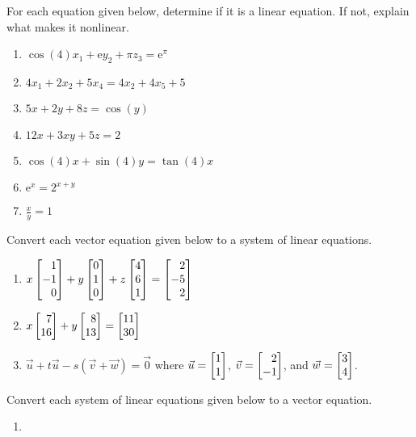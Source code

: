 \begin{exercises}
	\begin{problist}
		\prob For each equation given below, determine if it is a linear
		equation. If not, explain what makes it nonlinear.
		\begin{enumerate}
			\item $\cos(4)x_{1}+\mathrm{e}y_{2}+\pi z_{3}=\mathrm{e}^{\pi}$

			\item $4x_{1}+2x_{2}+5x_{4}=4x_{2}+4x_{5}+5$
			
			\item $5x+2y+8z=\cos(y)$

			\item $12x+3xy+5z=2$

			\item $\cos(4)x+\sin(4)y=\tan(4)x$

			\item $\mathrm{e}^{x}=2^{x+y}$

			\item $\frac{x}{y}=1$
		\end{enumerate}

		\prob Convert each vector equation given below to a system of linear
		equations.

		\begin{enumerate}
			\item $x\mat{1 \\ -1 \\ 0}+y\mat{0 \\ 1 \\ 0}+z\mat{4 \\ 6 \\ 1}=\mat{2 \\ -5 \\ 2}$

			\item $x\mat{7 \\ 16}+y\mat{8 \\ 13}=\mat{11 \\ 30}$

			\item $\vec u+t\vec u - s(\vec v+\vec w)=\vec 0$ where $\vec u=\mat{1\\1}$, $\vec v=\mat{2\\-1}$,
				and $\vec w=\mat{3\\4}$.
		\end{enumerate}

		\prob Convert each system of linear equations given below to a vector equation.
		\begin{enumerate}
			\item {}


\end{enumerate}
\end{problist}
\end{exercises}
